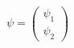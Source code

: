 \begin{equation}
\psi = \left( \begin{array}{c}
\psi_1 \\  \psi_2 \end{array} \right)
\end{equation}

